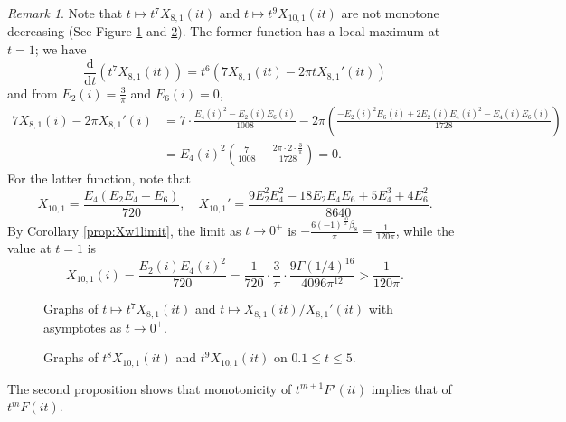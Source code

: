 \documentclass[10pt,reqno]{amsproc}
\newcommand{\dd}{\mathrm{d}}
\newcommand{\1}{\mathds{1}}	%
\theoremstyle{definition}
\theoremstyle{remark}
\newtheorem{remark}[theorem]{Remark}
\begin{document}
\begin{remark}
\label{remark:X81X101}
Note that $t \mapsto t^{7} X_{8, 1}(it)$ and $t \mapsto t^{9} X_{10, 1}(it)$ are not monotone decreasing (See Figure \ref{fig:X81} and \ref{fig:X101}).
The former function has a local maximum at $t = 1$; we have
\[
\frac{\dd}{\dd t} (t^{7} X_{8, 1}(it)) = t^6 (7 X_{8, 1}(it) - 2\pi t X_{8, 1}'(it))
\]
and from $E_2(i) = \frac{3}{\pi}$ and $E_6(i) = 0$,
\begin{align*}
    7 X_{8, 1}(i) - 2\pi X_{8, 1}'(i) &= 7 \cdot \frac{E_4(i)^2 - E_2(i) E_6(i)}{1008} - 2\pi \left(\frac{-E_2(i)^2 E_6(i) + 2 E_2(i) E_4(i)^2 - E_4(i) E_6(i)}{1728}\right) \\
    &= E_4(i)^2 \left(\frac{7}{1008} - \frac{2\pi \cdot 2 \cdot \frac{3}{\pi}}{1728}\right) = 0.
\end{align*}
For the latter function, note that
\[
X_{10, 1} = \frac{E_4(E_2 E_4 - E_6)}{720}, \quad X_{10, 1}' = \frac{9 E_2^2 E_4^2 - 18 E_2 E_4 E_6 + 5 E_4^3 + 4 E_6^2}{8640}.
\]
By Corollary \ref{prop:Xw1limit}, the limit as $t \to 0^+$ is $-\frac{6(-1)^{\frac{10}{2}} \beta_8}{\pi} = \frac{1}{120\pi}$, while the value at $t = 1$ is
\[
X_{10, 1}(i) = \frac{E_2(i) E_4(i)^2}{720} = \frac{1}{720} \cdot \frac{3}{\pi} \cdot \frac{9 \Gamma(1/4)^{16}}{4096 \pi^{12}} > \frac{1}{120\pi}.
\]
\end{remark}

\begin{figure}[t]%
    \centering
    \subfloat[\centering $t^{7}X_{8, 1}(it)$]{{}}%
    \qquad
    \subfloat[\centering $X_{8, 1}(it) / X_{8, 1}'(it)$]{{}}%
    \caption{Graphs of $t \mapsto t^{7} X_{8, 1}(it)$ and $t \mapsto X_{8, 1}(it) / X_{8, 1}'(it)$ with asymptotes as $t \to 0^+$.}%
    \label{fig:X81}%
\end{figure}

\begin{figure}[t]%
    \centering
    \subfloat[\centering $t^8 X_{10, 1}(it)$]{{}}%
    \qquad
    \subfloat[\centering $t^9 X_{10, 1}(it)$]{{}}%
    \caption{Graphs of $t^8 X_{10, 1}(it)$ and $t^9 X_{10, 1}(it)$ on $0.1 \le t \le 5$.}%
    \label{fig:X101}%
\end{figure}


The second proposition shows that monotonicity of $t^{m+1} F'(it)$ implies that of $t^m F(it)$.
\end{document}

